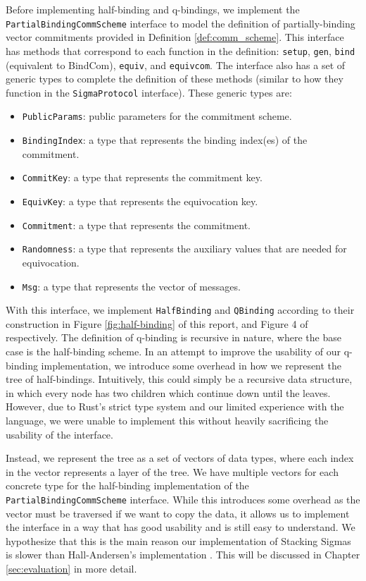 Before implementing half-binding and q-bindings, we implement the \texttt{PartialBindingCommScheme} interface 
to model the definition of partially-binding vector commitments provided in Definition \ref{def:comm_scheme}. 
This interface has methods that correspond to each function in the definition: \texttt{setup}, \texttt{gen}, 
\texttt{bind} (equivalent to \textsf{BindCom}), \texttt{equiv}, and \texttt{equivcom}. 
The interface also has a set of generic types to complete the definition of these methods (similar to how 
they function in the \texttt{SigmaProtocol} interface). These generic types are:
\begin{itemize}
  \item \texttt{PublicParams}: public parameters for the commitment scheme. 
  \item \texttt{BindingIndex}: a type that represents the binding index(es) of the commitment. 
  \item \texttt{CommitKey}: a type that represents the commitment key.
  \item \texttt{EquivKey}: a type that represents the equivocation key. 
  \item \texttt{Commitment}: a type that represents the commitment.
  \item \texttt{Randomness}: a type that represents the auxiliary values that are needed for equivocation. 
  \item \texttt{Msg}: a type that represents the vector of messages. 
\end{itemize}

With this interface, we implement \texttt{HalfBinding} and \texttt{QBinding} according to their 
construction in Figure \ref{fig:half-binding} of this report, and Figure 4 of \cite{StackingSigmas} 
respectively. The definition of q-binding is recursive in nature, where the base case is the 
half-binding scheme. In an attempt to improve the usability of our q-binding implementation, we introduce 
some overhead in how we represent the tree of half-bindings. Intuitively, this could simply be a 
recursive data structure, in which every node has two children which continue down until the leaves. 
However, due to Rust's strict type system and our limited experience with the language, we were unable 
to implement this without heavily sacrificing the usability of the interface. 

Instead, we represent the tree as a set of vectors of data types, where each index in the vector represents a 
layer of the tree. We have multiple vectors for each concrete type for the half-binding implementation of the 
\texttt{PartialBindingCommScheme} interface. While this introduces some overhead as the vector must be 
traversed if we want to copy the data, it allows us to implement the interface in a way that has good 
usability and is still easy to understand. We hypothesize that this is the main reason our implementation of 
Stacking Sigmas is slower than Hall-Andersen's implementation \cite{MHAStackSig}. This will be discussed in 
Chapter \ref{sec:evaluation} in more detail. 

